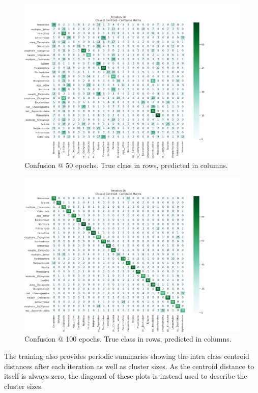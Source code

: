 \documentclass[10pt]{article}
\begin{document}
\begin{figure}
\includegraphics[scale=.5]{val_confusion_10.png}
\caption{Confusion @ 50 epochs. True class in rows, predicted in columns.}
\end{figure}

\begin{figure}
\includegraphics[scale=.5]{val_confusion_20.png}
\caption{Confusion @ 100 epochs. True class in rows, predicted in columns.}
\end{figure}

The training also provides periodic summaries showing the intra class centroid distances after each iteration as well as cluster sizes. As the centroid distance to itself is always zero, the diagonal of these plots is instead used to describe the cluster sizes.
\end{document}
